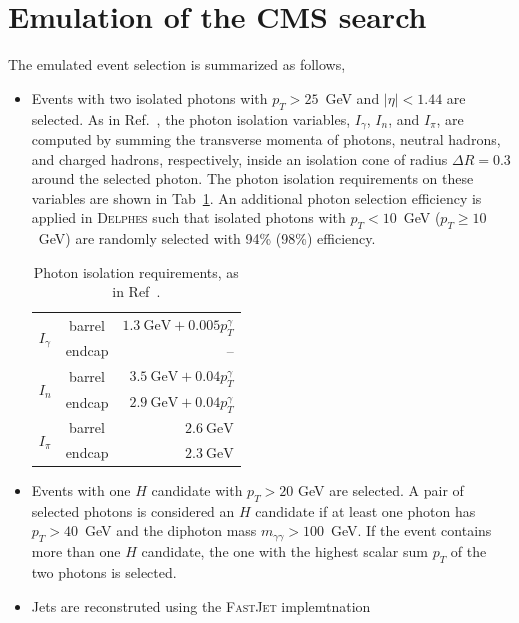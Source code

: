 \section{Emulation of the CMS search}
\label{sec:analysis}

The emulated event selection is summarized as follows,
\begin{itemize}
\item Events with two isolated photons with $p_T>25$~GeV and
  $|\eta|<1.44$ are selected. As in Ref.~\cite{CMSPhoton}, the photon
  isolation variables, $I_{\gamma}$, $I_{n}$, and $I_{\pi}$, are
  computed by summing the transverse momenta of photons, neutral
  hadrons, and charged hadrons, respectively, inside an isolation
  cone of radius $\Delta R=0.3$ around the selected photon. The photon
  isolation requirements on these variables
  are shown in Tab~\ref{tab:isolation}. An additional photon selection
  efficiency is applied in \textsc{Delphes} such that isolated photons with $p_T<10$~GeV ($p_T\geq10$~GeV) are
  randomly selected with 94\% (98\%) efficiency.
\begin{table}
\caption{\label{tab:isolation}Photon isolation requirements, as in Ref~\cite{CMSPhoton}.}
\begin{tabular}{lc|r}
 \multirow{2}{*}{$I_{\gamma}$} & barrel & $1.3~\textrm{GeV} + 0.005p_T^{\gamma}$\\
 & endcap & -- \\\hline
 \multirow{2}{*}{$I_{n}$} & barrel & $3.5~\textrm{GeV} + 0.04p_T^{\gamma}$\\
 & endcap &  $2.9~\textrm{GeV} + 0.04p_T^{\gamma}$ \\\hline
 \multirow{2}{*}{$I_{\pi}$} & barrel & $2.6~\textrm{GeV}$\\
 & endcap &  $2.3~\textrm{GeV}$ \\
\end{tabular}
\end{table}
\item Events with one $H$ candidate with $p_T>20$ GeV are selected. A pair of selected
  photons is considered an $H$ candidate if at
  least one photon has $p_T>40$~GeV and the diphoton mass
  $m_{\gamma\gamma}>100$~GeV. If the event contains more than one $H$ candidate,
  the one with the highest scalar sum $p_T$ of the two photons is selected. 
\item Jets are reconstruted using the \textsc{FastJet}\cite{FastJet} implemtnation

\end{itemize}
